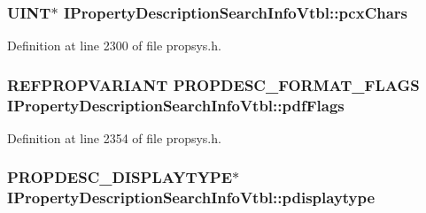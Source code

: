 \subsubsection[{\texorpdfstring{pcx\+Chars}{pcxChars}}]{ {\bf U\+I\+NT}$\ast$ I\+Property\+Description\+Search\+Info\+Vtbl\+::pcx\+Chars}\hypertarget{struct_i_property_description_search_info_vtbl_a28f2ee1b7b5faa4371e8adb4aa2b6d93}{}\label{struct_i_property_description_search_info_vtbl_a28f2ee1b7b5faa4371e8adb4aa2b6d93}


Definition at line 2300 of file propsys.\+h.

\subsubsection[{\texorpdfstring{pdf\+Flags}{pdfFlags}}]{ {\bf R\+E\+F\+P\+R\+O\+P\+V\+A\+R\+I\+A\+NT} {\bf P\+R\+O\+P\+D\+E\+S\+C\+\_\+\+F\+O\+R\+M\+A\+T\+\_\+\+F\+L\+A\+GS} I\+Property\+Description\+Search\+Info\+Vtbl\+::pdf\+Flags}\hypertarget{struct_i_property_description_search_info_vtbl_adb1ff8cdd1cfcf123f410a76faa9c21f}{}\label{struct_i_property_description_search_info_vtbl_adb1ff8cdd1cfcf123f410a76faa9c21f}


Definition at line 2354 of file propsys.\+h.

\subsubsection[{\texorpdfstring{pdisplaytype}{pdisplaytype}}]{ {\bf P\+R\+O\+P\+D\+E\+S\+C\+\_\+\+D\+I\+S\+P\+L\+A\+Y\+T\+Y\+PE}$\ast$ I\+Property\+Description\+Search\+Info\+Vtbl\+::pdisplaytype}\hypertarget{struct_i_property_description_search_info_vtbl_ad85f07bbca09acd5d99f0f8f50184c0a}{}\label{struct_i_property_description_search_info_vtbl_ad85f07bbca09acd5d99f0f8f50184c0a}


